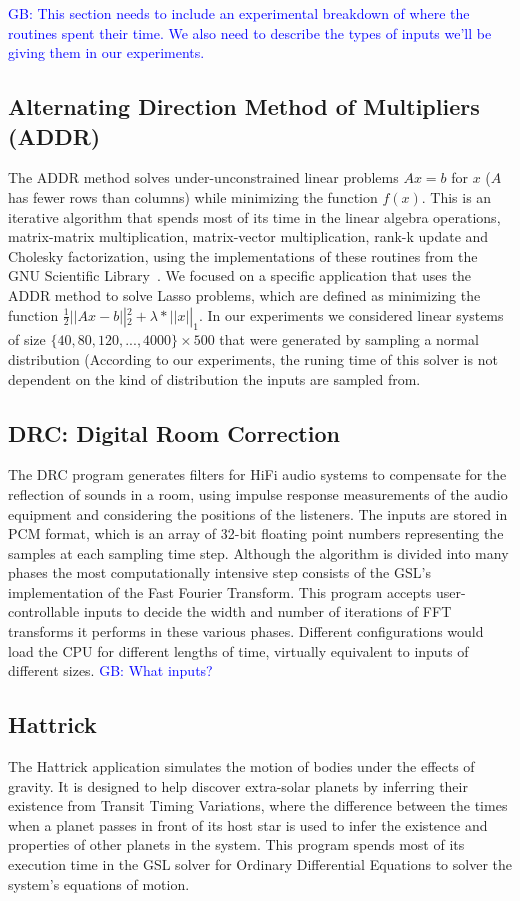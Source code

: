 \documentclass{sig-alternate}
\newcommand{\greg}[1]{%
  \textcolor{blue}{GB: #1}
}
\begin{document}
\greg{This section needs to include an experimental breakdown of where the routines spent their time. We also need to describe the types of inputs we'll be giving them in our experiments.}

\subsection{Alternating Direction Method of Multipliers (ADDR)}
\label{sec:apps:lasso}
The ADDR method solves under-unconstrained linear problems $Ax=b$ for $x$ ($A$ has fewer rows than columns) while minimizing the function $f(x)$.
This is an iterative algorithm that spends most of its time in the linear algebra operations, matrix-matrix multiplication, matrix-vector multiplication, rank-k update and Cholesky factorization, using the implementations of these routines from the GNU Scientific Library~\cite{gsl:2011}.
We focused on a specific application that uses the ADDR method to solve Lasso problems, which are defined as minimizing the function $\frac{1}{2} \left|| Ax - b \right||_2^2 + \lambda*\left|| x \right||_1$.
In our experiments we considered linear systems of size $\{40, 80, 120, ..., 4000\} \times 500$ that were generated by sampling a normal distribution (According to our experiments, the runing time of this solver is not dependent on the kind of distribution the inputs are sampled from.

\subsection{DRC: Digital Room Correction}
\label{sec:apps:drc}

The DRC program generates filters for HiFi audio systems to compensate for the reflection of sounds in a room, using impulse response measurements of the audio equipment and considering the positions of the listeners. The inputs are stored in PCM format, which is an array of 32-bit floating point numbers representing the samples at each sampling time step.
Although the algorithm is divided into many phases the most computationally intensive step consists of the GSL's implementation of the Fast Fourier Transform. This program accepts user-controllable inputs to decide the width and number of iterations of FFT transforms it performs in these various phases. Different configurations would load the CPU for different lengths of time, virtually equivalent to inputs of different sizes.
\greg{What inputs?}

\subsection{Hattrick}
\label{sec:apps:hattrick}
The Hattrick application simulates the motion of bodies under the effects of gravity.
It is designed to help discover extra-solar planets by inferring their existence from Transit Timing Variations, where the difference between the times when a planet passes in front of its host star is used to infer the existence and properties of other planets in the system.
This program spends most of its execution time in the GSL solver for Ordinary Differential Equations to solver the system's equations of motion.
\end{document}
